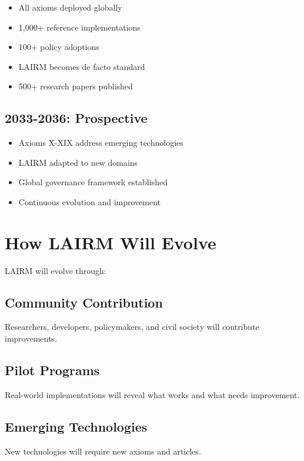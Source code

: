 \documentclass[12pt,a4paper,twoside,openright]{book}
\begin{document}
\begin{itemize}
    \item All axioms deployed globally
    \item 1,000+ reference implementations
    \item 100+ policy adoptions
    \item LAIRM becomes de facto standard
    \item 500+ research papers published
\end{itemize}

\subsection{2033-2036: Prospective}

\begin{itemize}
    \item Axioms X-XIX address emerging technologies
    \item LAIRM adapted to new domains
    \item Global governance framework established
    \item Continuous evolution and improvement
\end{itemize}

\section{How LAIRM Will Evolve}

LAIRM will evolve through:

\subsection{Community Contribution}

Researchers, developers, policymakers, and civil society will contribute improvements.

\subsection{Pilot Programs}

Real-world implementations will reveal what works and what needs improvement.

\subsection{Emerging Technologies}

New technologies will require new axioms and articles.
\end{document}
